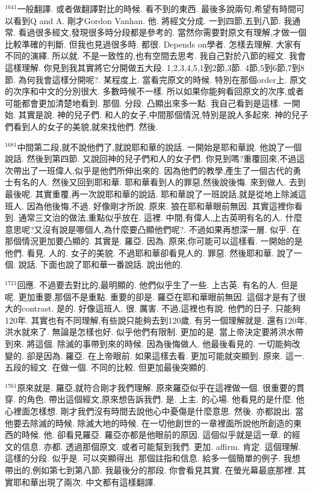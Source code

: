 \documentclass{book}
\begin{document}
$^{1641}$一般翻譯.
或者做翻譯對比的時候.
看不到的東西.
最後多說兩句,希望有時間可以看到Q and A.
剛才Gordon Vanhan.
他.
將經文分成.
一到四節,五到八節.
我通常.
看過很多經文,發現很多時分段都是參考的.
當然你需要對原文有理解,才做一個比較準確的判斷.
但我也見過很多時.
都很.
Depends on學者.
怎樣去理解.
大家有不同的演繹.
所以就.
不是一致性的,也有空間去思考.
我自己對於八節的經文.
我會這樣理解.
你見到我其實將它分開做五大段.
1,2,3,4,5,1到2節,3節.
4節,5到6節,7到8節.
為何我會這樣分開呢?.
某程度上.
當看完原文的時候.
特別在那個order上.
原文的次序和中文的分別很大.
多數時候不一樣.
所以如果你能夠看回原文的次序,或者可能都會更加清楚地看到.
那個.
分段.
凸顯出來多一點.
我自己看到是這樣.
一開始.
其實是說.
神的兒子們.
和人的女子,中間那個情況,特別是說人多起來.
神的兒子們看到人的女子的美貌,就來找他們.
然後.

$^{1681}$中間第二段,就不說他們了,就說耶和華的說話.
一開始是耶和華說.
他說了一個說話.
然後到第四節.
又說回神的兒子們和人的女子們.
你見到嗎?重覆回來,不過這次帶出了一班偉人,似乎是他們所伸出來的.
因為他們的教學,產生了一個古代的勇士有名的人.
然後又回到耶和華.
耶和華看到人的罪惡,然後說後悔.
來到做人.
去到最後呢.
其實重覆,再一次說耶和華的說話.
耶和華說了一班說話,就是從地上除滅這班人.
因為他後悔,不過.
好像剛才所說.
原來.
狼在耶和華眼前無因.
其實這裡你看到.
通常三文治的做法,重點似乎放在.
這裡.
中間,有偉人,上古英明有名的人.
什麼意思呢?又沒有說是哪個人,為什麼要凸顯他們呢?.
不過如果再想深一層.
似乎.
在那個情況更加要凸顯的.
其實是.
羅亞.
因為.
原來,你可能可以這樣看.
一開始的是他們.
看見.
人的.
女子的美貌.
不過耶和華卻看見人的.
罪惡.
然後耶和華.
說了一個.
說話.
下面也說了耶和華一番說話.
說出他的.

$^{1721}$回應.
不過要去對比的,最明顯的.
他們似乎生了一些.
上古英.
有名的人.
但是呢.
更加重要,那個不是重點.
重要的卻是.
羅亞在耶和華眼前無因.
這個才是有了很大的contrast.
是的.
好像這班人.
很.
厲害.
不過,這裡也有說.
他們的日子.
只能夠120年.
其實也有不同理解,有些說只能夠去到120歲.
有另一個理解就是.
還有120年,洪水就來了.
無論是怎樣也好.
似乎他們有限制.
更加的是.
當上帝決定要將洪水帶到來.
將這個.
除滅的事帶到來的時候.
因為後悔做人.
他最後看見的.
一切能夠改變的.
卻是因為.
羅亞.
在上帝眼前.
如果這樣去看.
更加可能就突顯到.
原來.
這一.
五段的經文.
在做一個.
不同的比較.
但更加最後突顯的.

$^{1761}$原來就是.
羅亞,就符合剛才我們理解.
原來羅亞似乎在這裡做一個.
很重要的貫穿.
的角色.
帶出這個經文,原來想告訴我們.
是.
上主.
的心場.
他看見的是什麼.
他心裡面怎樣想.
剛才我們沒有時間去說他心中憂傷是什麼意思.
然後.
亦都說出.
當他要去除滅的時候.
除滅大地的時候.
在一切他創世的一章裡面所說他所創造的東西的時候.
他.
卻看見羅亞.
羅亞亦都是他眼前的原因.
這個似乎就是這一章.
的經文的信息.
亦都.
透過那個原文.
或者可能幫到我們.
更加.
affirm.
肯定.
這個理解.
這樣的分段.
似乎是.
可以突顯得出.
那個註指和信息.
給多一個簡單的例子.
我想帶出的,例如第七到第八節.
我最後分的那段.
你會看見其實.
在螢光幕最底那裡.
其實耶和華出現了兩次.
中文都有這樣翻譯.
\end{document}
